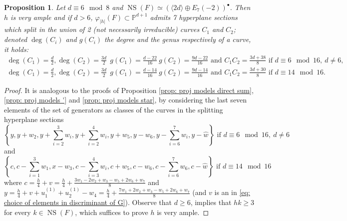 \documentclass{amsart}
\newtheorem{prop}[thm]{Proposition}
\theoremstyle{definition}
\numberwithin{equation}{section}
\numberwithin{equation}{section} \theoremstyle{definition}
\DeclareMathOperator{\NS}{NS}
\begin{document}
\begin{prop}\label{prop: proj models bullet}
Let $d\equiv 6\mod 8$ and $\NS(F)\simeq (\langle 2d\rangle\oplus E_7(-2))^{\bullet}$.
Then $h$ is very ample and if $d>6$, $\varphi_{|h|}(F)\subset\mathbb{P}^{d+1}$ admits 7 hyperplane sections which split in the union of 2 (not necessarily irreducible) curves $C_1$ and $C_2$; denoted $\deg(C_i)$ and $g(C_i)$ the degree and the genus respectively of a curve, it holds:
$$\begin{array}{l}
\deg(C_1)=\frac{d}{2},\deg(C_2)=\frac{3d}{2}\ \ g(C_1)=\frac{d-22}{16}\ g(C_2)=\frac{9d-22}{16}\mbox{ and }C_1C_2=\frac{3d+38}{8}\mbox{ if }d\equiv 6 \mod 16,\ d\neq 6,\\
\deg(C_1)=\frac{d}{2},\deg(C_2)=\frac{3d}{2}\ \ g(C_1)=\frac{d-14}{16}\ g(C_2)=\frac{9d-14}{16}\mbox{ and }C_1C_2=\frac{3d+30}{8}\mbox{ if }d\equiv 14 \mod 16.
\end{array}$$
\end{prop}\begin{proof}
It is analogous to the proofs of Proposition \ref{prop: proj models direct sum}, \ref{prop: proj models '} and \ref{prop: proj models star}, by considering the last seven elements of the set of generators as classes of the curves in the splitting hyperplane sections
$$\left\{y, y+w_2,y+\sum_{i=2}^3w_i,y+\sum_{i=2}^4w_i,y+w_5,y-w_6,y-\sum_{i=6}^7w_i,y-\hat{w}\right\}\mbox{ if }d\equiv 6\mod 16,\ d\neq 6$$
and $$\left\{c, c-\sum_{i=1}^3w_1,x-w_3, c-\sum_{i=3}^4w_i, c+w_5, c-w_6, c-\sum_{i=6}^7w_6, c-\hat{w}\right\}
\mbox{ if }d\equiv 14\mod 16$$
where $c=\frac{h}{4}+v=\frac{h}{4}+\frac{3w_1-2w_2+w_3-w_5+2w_6+w_7}{8}$ and $y=\frac{h}{4}+v+u_1^{(1)}+u_2^{(1)}-w_4=\frac{h}{4}+\frac{7w_1+2w_2+w_3-w_5+2w_6+w_7}{8}$ 
(and $v$ is an in \eqref{eq: choice of elements in discriminant of G}). Observe that $d\geq 6$, implies that $hk\geq 3$ for every $k\in \NS(F)$, which suffices to prove $h$ is very ample.
\end{proof}
\end{document}
